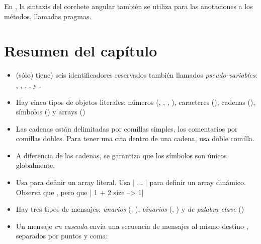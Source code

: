 \documentclass[a4paper,10pt,twoside]{book}
\begin{document}
En \pharo, la sintaxis del corchete angular tambi\'en se utiliza para las anotaciones a los m\'etodos, llamadas pragmas.

\section{Resumen del cap\'itulo}

\begin{itemize}

\item	\pharo (s\'olo) tiene)  seis identificadores reservados tambi\'en llamados \textit{pseudo-variables}: , , , ,  y .

\item	Hay cinco tipos de objetos literales: n\'umeros (, , , ), caracteres (), cadenas (), s\'imbolos () y arrays ()

\item	Las cadenas est\'an delimitadas por comillas simples, los comentarios por comillas dobles.
		Para tener una cita dentro de una cadena, usa doble comilla.

\item	A diferencia de las cadenas, se garantiza que los s\'imbolos son \'unicos globalmente.

\item	Usa  para definir un array literal.
		Usa \ct|{ ... }| para definir un array din\'amico.
		Observa que
		, pero que
		\ct|{ 1 + 2 } size --> 1|

\item	Hay tres tipos de mensajes:
		\emph{unarios} (\eg {}, ),
		\emph{binarios} (\eg {}, ) y
		\emph{de palabra clave} (\eg {})

\item	Un mensaje \emph{en cascada} env\'ia una secuencia de mensajes al mismo destino , separados por puntos y coma:


\end{itemize}
\end{document}
